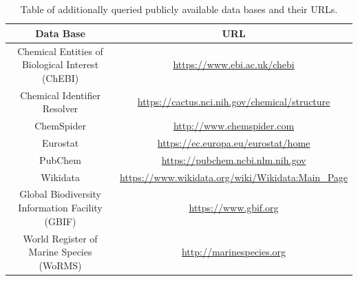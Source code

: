 \documentclass[journal,datadescriptor,accept,moreauthors,pdftex]{Definitions/mdpi}
\begin{document}
\appendix
\section{}
\begin{table}[H]
    \caption{Table of additionally queried publicly available data bases and their URLs.}
    \label{tab:data-base-additional}
    \centering
\begin{tabular}{cc}
    \toprule
    \textbf{Data Base} & \textbf{URL} \\ 
    \midrule
    \makecell{Chemical Entities of \\ Biological Interest (ChEBI)} & \url{https://www.ebi.ac.uk/chebi}  \\
    Chemical Identifier Resolver & \url{https://cactus.nci.nih.gov/chemical/structure}  \\[0.5cm]
    ChemSpider & \url{http://www.chemspider.com}    \\[0.5cm]
    Eurostat & \url{https://ec.europa.eu/eurostat/home} \\[0.5cm]
    PubChem & \url{https://pubchem.ncbi.nlm.nih.gov} \\[0.5cm]
    Wikidata & \url{https://www.wikidata.org/wiki/Wikidata:Main_Page} \\[0.5cm]
    \makecell{Global Biodiversity \\ Information Facility (GBIF)} & \url{https://www.gbif.org} \\[0.5cm]
    \makecell{World Register of \\ Marine Species (WoRMS)} & \url{http://marinespecies.org} \\
    \bottomrule
\end{tabular}
\end{table}
\end{document}
